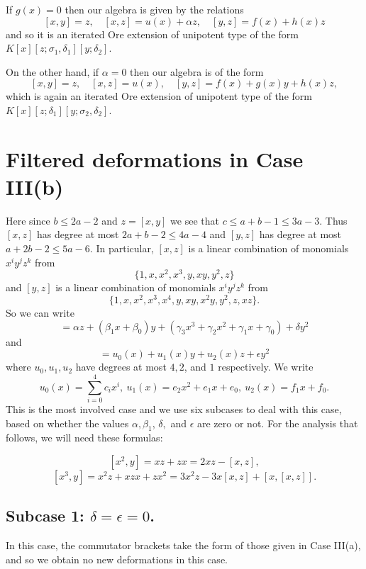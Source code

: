 \documentclass[a4paper,11pt,twoside,notitlepage,reqno]{amsart}
\theoremstyle{plain}
\numberwithin{thm}{section}
\theoremstyle{definition}
\begin{document}
If $g(x)=0$ then our algebra is given by the relations 
$$[x,y]=z, \quad [x,z] =  u(x) +  \alpha z, \quad [y,z] = f(x) +h(x)z$$ and so it is an iterated Ore extension of unipotent type of the form $K[x][z;\sigma_1,\delta_1][y;\delta_2]$.

On the other hand, if $\alpha=0$ then our algebra is of the form
$$[x,y]=z, \quad [x,z] =  u(x), \quad [y,z] = f(x) + g(x) y+h(x)z,$$ which is again an iterated Ore extension of unipotent type of the form
$K[x][z;\delta_1][y;\sigma_2,\delta_2]$.


\section{Filtered deformations in Case III(b)} \label{sec:IIIb}
Here since $b\le 2a-2$ and $z=[x,y]$ we see that $c\le a+b-1\le 3a-3$.  Thus
$[x,z]$ has degree at most $2a+b-2\le 4a-4$ and $[y,z]$ has degree at most $a+2b-2\le 5a-6$.  In particular, $[x,z]$ is a linear combination of monomials $x^i y^j z^k$ from
$$\{1,x,x^2,x^3, y, xy, y^2, z\}$$ and 
$[y,z]$ is a linear combination of monomials $x^i y^j z^k$ from
$$\{1,x,x^2,x^3, x^4, y, xy, x^2y, y^2, z, xz\}.$$  
So we can write
\begin{equation}
[x,z]= \alpha z + (\beta_1 x +\beta_0) y + (\gamma_3 x^3+ \gamma_2 x^2 + \gamma_1 x + \gamma_0 ) +\delta y^2
\end{equation}
and
\begin{equation}
[y,z]= u_0(x) + u_1(x) y + u_2(x) z + \epsilon y^2 
\end{equation}
where $u_0, u_1, u_2$ have degrees at most $4, 2$, and $1$ respectively.
We write $$u_0(x)=\textstyle\sum_{i=0}^4 c_ix^i,\ u_1(x)=e_2x^2+e_1x+e_0,\ u_2(x)=f_1x+f_0.$$
This is the most involved case and we use six subcases to deal with this case, based on whether the values $\alpha, \beta_1$, $\delta,$ and $\epsilon$ are zero or not.
For the analysis that follows, we will need these formulas:

\begin{equation} \label{eq:xxy}
[x^2,y] = xz+zx = 2xz - [x,z],
\end{equation}
\begin{equation} \label{eq:xxxy}
 [x^3, y] = x^2 z + xzx + zx^2 = 3x^2z - 3x[x,z] + [x,[x,z]].
 \end{equation}

\subsection{Subcase 1: $\delta=\epsilon=0$.}
In this case, the commutator brackets take the form of those given in Case III(a), and so we obtain no new deformations in this case.
\end{document}
